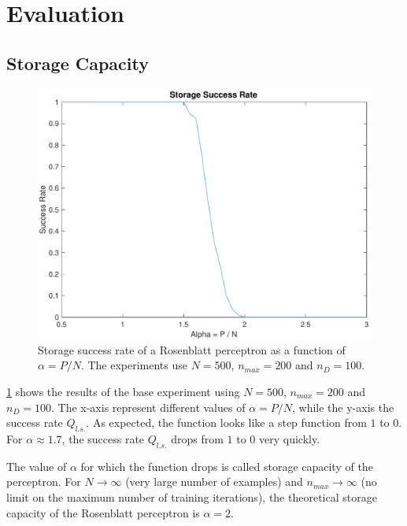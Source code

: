 \section{Evaluation}
\label{sec:evaluation}

\subsection{Storage Capacity}
\label{subsec:capacity}
\begin{figure}[t]
	\centering
	\includegraphics[width=\columnwidth]{figures/base}
    \caption{Storage success rate of a Rosenblatt perceptron as a function of $\alpha = P / N$. The experiments use $N = 500$, $n_{max} = 200$ and $n_D = 100$.}
	\label{fig:base}
\end{figure}

\cref{fig:base} shows the results of the base experiment using $N = 500$, $n_{max} = 200$ and $n_D = 100$.
The x-axis represent different values of $\alpha = P / N$, while the y-axis the success rate $Q_{l.s.}$.
As expected, the function looks like a step function from $1$ to $0$.
For $\alpha \approx 1.7$, the success rate $Q_{l.s.}$ drops from $1$ to $0$ very quickly. 

The value of $\alpha$ for which the function drops is called storage capacity of the perceptron.
For $N \to \infty$ (very large number of examples) and $n_{max} \to \infty$ (no limit on the maximum number of training iterations), the theoretical storage capacity of the Rosenblatt perceptron is $\alpha = 2$.

